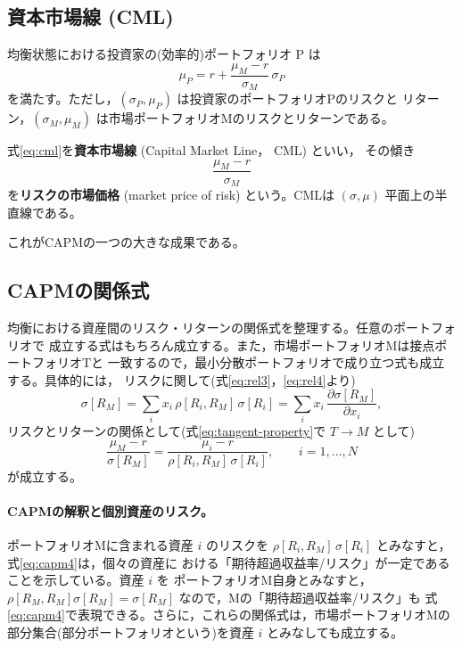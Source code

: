 \subsection{資本市場線 (CML)}

均衡状態における投資家の(効率的)ポートフォリオ P は
\begin{equation}
\mu_P = r + \frac{\mu_M - r}{\sigma_M}\,\sigma_P
\label{eq:cml}
\end{equation}
を満たす。ただし，$(\sigma_P,\mu_P)$ は投資家のポートフォリオPのリスクと
リターン，$(\sigma_M,\mu_M)$ は市場ポートフォリオMのリスクとリターンである。

\begin{definition}[資本市場線とリスクの市場価格]
式\eqref{eq:cml}を\textbf{資本市場線} (Capital Market Line， CML) といい，
その傾き
\begin{equation}
\frac{\mu_M - r}{\sigma_M}
\end{equation}
を\textbf{リスクの市場価格} (market price of risk) という。CMLは
$(\sigma,\mu)$ 平面上の半直線である。
\end{definition}

これがCAPMの一つの大きな成果である。

\subsection{CAPMの関係式}

均衡における資産間のリスク・リターンの関係式を整理する。任意のポートフォリオで
成立する式はもちろん成立する。また，市場ポートフォリオMは接点ポートフォリオTと
一致するので，最小分散ポートフォリオで成り立つ式も成立する。具体的には，
リスクに関して(式\eqref{eq:rel3}，\eqref{eq:rel4}より)
\begin{equation}
\sigma[R_M] = \sum_i x_i\,\rho[R_i,R_M]\,\sigma[R_i]
= \sum_i x_i\,\frac{\partial\sigma[R_M]}{\partial x_i},
\label{eq:capm3}
\end{equation}
リスクとリターンの関係として(式\eqref{eq:tangent-property}で $T\to M$ として)
\begin{equation}
\frac{\mu_M - r}{\sigma[R_M]}
= \frac{\mu_i - r}{\rho[R_i,R_M]\,\sigma[R_i]},
\qquad i = 1,\dots,N
\label{eq:capm4}
\end{equation}
が成立する。

\paragraph{CAPMの解釈と個別資産のリスク。}
ポートフォリオMに含まれる資産 $i$ のリスクを
$\rho[R_i,R_M]\,\sigma[R_i]$ とみなすと，式\eqref{eq:capm4}は，個々の資産に
おける「期待超過収益率/リスク」が一定であることを示している。資産 $i$ を
ポートフォリオM自身とみなすと，
$\rho[R_M,R_M]\sigma[R_M] = \sigma[R_M]$ なので，Mの「期待超過収益率/リスク」も
式\eqref{eq:capm4}で表現できる。さらに，これらの関係式は，市場ポートフォリオMの
部分集合(部分ポートフォリオという)を資産 $i$ とみなしても成立する。

